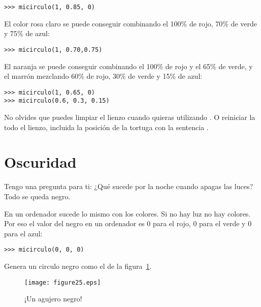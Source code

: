 \begin{listing}
\begin{verbatim}
>>> micirculo(1, 0.85, 0)
\end{verbatim}
\end{listing}

\noindent
El color rosa claro se puede conseguir combinando el 100\% de rojo, 70\% de verde y 75\% de azul:

\begin{listing}
\begin{verbatim}
>>> micirculo(1, 0.70,0.75)
\end{verbatim}
\end{listing}

\noindent
El naranja se puede conseguir combinando el 100\% de rojo y el 65\% de verde, y el marrón mezclando 60\% de rojo, 30\% de verde y 15\% de azul:

\begin{listing}
\begin{verbatim}
>>> micirculo(1, 0.65, 0)
>>> micirculo(0.6, 0.3, 0.15)
\end{verbatim}
\end{listing}

\noindent
No olvides que puedes limpiar el lienzo cuando quieras utilizando . O reiniciar la todo el lienzo, incluida la posición de la tortuga con la sentencia .

\section{Oscuridad}

Tengo una pregunta para ti: ¿Qué sucede por la noche cuando apagas las luces? Todo se queda negro.
\par
En un ordenador sucede lo mismo con los colores.  Si no hay luz no hay colores. Por eso el valor del negro en un ordenador es 0 para el rojo, 0 para el verde y 0 para el azul:

\begin{listing}
\begin{verbatim}
>>> micirculo(0, 0, 0)
\end{verbatim}
\end{listing}

Genera un circulo negro como el de la figura~\ref{fig25}.

\begin{figure}
\begin{center}
\texttt{[image: figure25.eps]}
\end{center}
\caption{¡Un agujero negro!}\label{fig25}
\end{figure}

